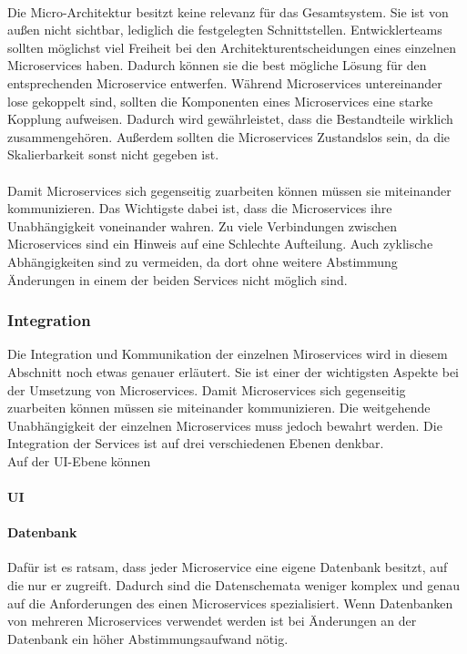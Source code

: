 \\
Die Micro-Architektur besitzt keine relevanz für das Gesamtsystem. Sie ist von außen nicht sichtbar, lediglich die festgelegten Schnittstellen. Entwicklerteams sollten möglichst viel Freiheit bei den Architekturentscheidungen eines einzelnen Microservices haben. Dadurch können sie die best mögliche Lösung für den entsprechenden Microservice entwerfen. Während Microservices untereinander lose gekoppelt sind, sollten die Komponenten eines Microservices eine starke Kopplung aufweisen. Dadurch wird gewährleistet, dass die Bestandteile wirklich zusammengehören. Außerdem sollten die Microservices Zustandslos sein, da die Skalierbarkeit sonst nicht gegeben ist. \\
\\
Damit Microservices sich gegenseitig zuarbeiten können müssen sie miteinander kommunizieren. Das Wichtigste dabei ist, dass die Microservices ihre Unabhängigkeit voneinander wahren. Zu viele Verbindungen zwischen Microservices sind ein Hinweis auf eine Schlechte Aufteilung. Auch zyklische Abhängigkeiten sind zu vermeiden, da dort ohne weitere Abstimmung Änderungen in einem der beiden Services nicht möglich sind. \\

\subsubsection{Integration}

Die Integration und Kommunikation der einzelnen Miroservices wird in diesem Abschnitt noch etwas genauer erläutert. Sie ist einer der wichtigsten Aspekte bei der Umsetzung von Microservices. Damit Microservices sich gegenseitig zuarbeiten können müssen sie miteinander kommunizieren. Die weitgehende Unabhängigkeit der einzelnen Microservices muss jedoch bewahrt werden. Die Integration der Services ist auf drei verschiedenen Ebenen denkbar. \\

Auf der UI-Ebene können 

\paragraph{UI}

\paragraph{Datenbank}

Dafür ist es ratsam, dass jeder Microservice eine eigene Datenbank besitzt, auf die nur er zugreift. Dadurch sind die Datenschemata weniger komplex und genau auf die Anforderungen des einen Microservices spezialisiert.  Wenn Datenbanken von mehreren Microservices verwendet werden ist bei Änderungen an der Datenbank ein höher Abstimmungsaufwand nötig.

